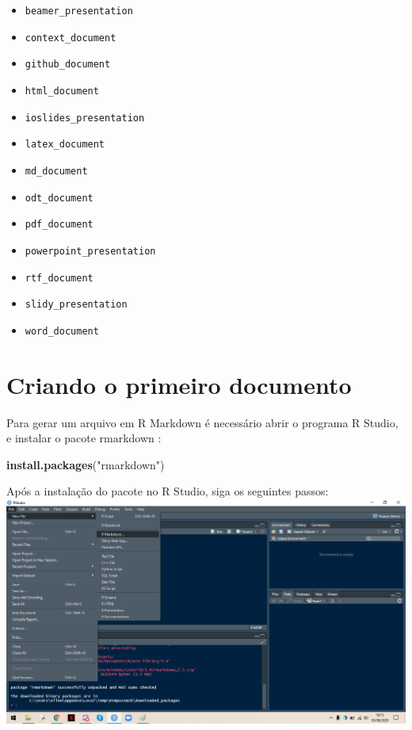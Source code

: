 \documentclass[
]{book}
\newenvironment{Shaded}{\begin{snugshade}}{\end{snugshade}}
\newcommand{\KeywordTok}[1]{\textcolor[rgb]{0.13,0.29,0.53}{\textbf{#1}}}
\newcommand{\NormalTok}[1]{#1}
\newcommand{\StringTok}[1]{\textcolor[rgb]{0.31,0.60,0.02}{#1}}
\providecommand{\tightlist}{%
  \setlength{\itemsep}{0pt}\setlength{\parskip}{0pt}}
\begin{document}
\begin{itemize}
\tightlist
\item
  \texttt{beamer\_presentation}
\item
  \texttt{context\_document}
\item
  \texttt{github\_document}
\item
  \texttt{html\_document}
\item
  \texttt{ioslides\_presentation}
\item
  \texttt{latex\_document}
\item
  \texttt{md\_document}
\item
  \texttt{odt\_document}
\item
  \texttt{pdf\_document}
\item
  \texttt{powerpoint\_presentation}
\item
  \texttt{rtf\_document}
\item
  \texttt{slidy\_presentation}
\item
  \texttt{word\_document}
\end{itemize}

\hypertarget{criando-o-primeiro-documento}{%
\section{Criando o primeiro documento}\label{criando-o-primeiro-documento}}

Para gerar um arquivo em R Markdown é necessário abrir o programa R Studio, e instalar o pacote rmarkdown :

\begin{Shaded}
\begin{Highlighting}[]
\KeywordTok{install.packages}\NormalTok{(}\StringTok{"rmarkdown"}\NormalTok{)}
\end{Highlighting}
\end{Shaded}

Após a instalação do pacote no R Studio, siga os seguintes passos:
\includegraphics{img/new.png}
\end{document}
